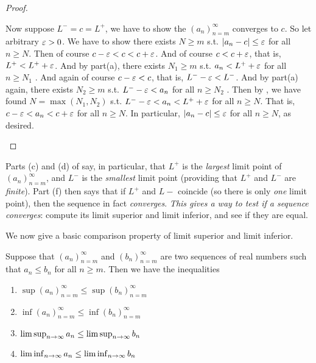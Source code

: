\begin{proof}
\begin{enumerate}
      Now suppose \(L^- = c = L^+\), we have to show the \((a_n)_{n = m}^{\infty}\) converges to \(c\).
      So let arbitrary \(\varepsilon > 0\).
      We have to show there exists \(N \ge m\) s.t. \(\lvert a_n - c\rvert \le \varepsilon\) for all \(n \ge N\).
      Then of course \(c - \varepsilon < c < c + \varepsilon\).
      And of course \(c < c + \varepsilon\), that is, \(L^+ < L^+ + \varepsilon\).
      And by part(a), there exists \(N_1 \ge m\) s.t. \(a_n < L^+ + \varepsilon\) for all \(n \ge N_1\) .
      And again of course \(c - \varepsilon < c\), that is, \(L^- - \varepsilon < L^-\).
      And by part(a) again, there exists \(N_2 \ge m\) s.t. \(L^- - \varepsilon < a_n\) for all \(n \ge N_2\) .
      Then by , we have found \(N = \max(N_1, N_2)\) s.t. \(L^- - \varepsilon < a_n < L^+ + \varepsilon\) for all \(n \ge N\).
      That is, \(c - \varepsilon < a_n < c + \varepsilon\) for all \(n \ge N\).
      In particular, \(\lvert a_n - c\rvert \le \varepsilon\) for all \(n \ge N\), as desired.
\end{enumerate}
\end{proof}

\begin{note}
Parts (c) and (d) of  say, in particular, that \(L^+\) is the \emph{largest} limit point of \((a_n)_{n = m}^{\infty}\), and \(L^-\) is the \emph{smallest} limit point
(providing that \(L^+\) and \(L^-\) are \emph{finite}).
Part (f) then says that if \(L^+\) and \(L-\) coincide (so there is only \emph{one} limit point), then the sequence in fact \emph{converges}.
\emph{This gives a way to test if a sequence converges}:
compute its limit superior and limit inferior, and see if they are equal.
\end{note}

We now give a basic comparison property of limit superior and limit inferior.

\begin{lemma}  \label{lem 6.4.13}
Suppose that \((a_n)_{n = m}^{\infty}\) and \((b_n)_{n = m}^{\infty}\) are two sequences of real numbers such that \(a_n \le b_n\) for all
\(n \ge m\).
Then we have the inequalities
\begin{enumerate}
    \item \(\sup(a_n)_{n = m}^{\infty} \le \sup(b_n)_{n = m}^{\infty}\)
    \item \(\inf(a_n)_{n = m}^{\infty} \le \inf(b_n)_{n = m}^{\infty}\)
    \item \(\limsup_{n \to \infty} a_n \le \limsup_{n \to \infty} b_n\)
    \item \(\liminf_{n \to \infty} a_n \le \liminf_{n \to \infty} b_n\)
\end{enumerate}
\end{lemma}

